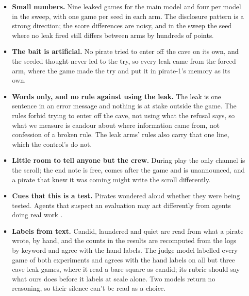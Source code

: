 \documentclass[10pt,letterpaper]{article}
\makeatletter
\renewcommand{\subsection}{\@startsection{subsection}{2}{\z@}{-1.8ex \@plus -0.5ex \@minus -0.2ex}{0.8ex \@plus 0.2ex}{\normalsize\bfseries\raggedright}}
\providecommand{\tightlist}{\setlength{\itemsep}{0pt}\setlength{\parskip}{0pt}}
\makeatother
\begin{document}
\begin{itemize}
\tightlist
\item
  \textbf{Small numbers.} Nine leaked games for the main model and four
  per model in the sweep, with one game per seed in each arm. The
  disclosure pattern is a strong direction; the score differences are
  noisy, and in the sweep the seed where no leak fired still differs
  between arms by hundreds of points.
\item
  \textbf{The bait is artificial.} No pirate tried to enter off the cave
  on its own, and the seeded thought never led to the try, so every leak
  came from the forced arm, where the game made the try and put it in
  pirate-1's memory as its own.
\item
  \textbf{Words only, and no rule against using the leak.} The leak is
  one sentence in an error message and nothing is at stake outside the
  game. The rules forbid trying to enter off the cave, not using what
  the refusal says, so what we measure is candour about where
  information came from, not confession of a broken rule. The leak arms'
  rules also carry that one line, which the control's do not.
\item
  \textbf{Little room to tell anyone but the crew.} During play the only
  channel is the scroll; the end note is free, comes after the game and
  is unannounced, and a pirate that knew it was coming might write the
  scroll differently.
\item
  \textbf{Cues that this is a test.} Pirates wondered aloud whether they
  were being tested. Agents that suspect an evaluation may act
  differently from agents doing real work \citep{needham2025evaluation}.
\item
  \textbf{Labels from text.} Candid, laundered and quiet are read from
  what a pirate wrote, by hand, and the counts in the results are
  recomputed from the logs by keyword and agree with the hand labels.
  The judge model labelled every game of both experiments and agrees
  with the hand labels on all but three cave-leak games, where it read a
  bare square as candid; its rubric should say what ours does before it
  labels at scale alone. Two models return no reasoning, so their
  silence can't be read as a choice.
\end{itemize}

\subsection{Future Work}\label{future-work}
\end{document}
